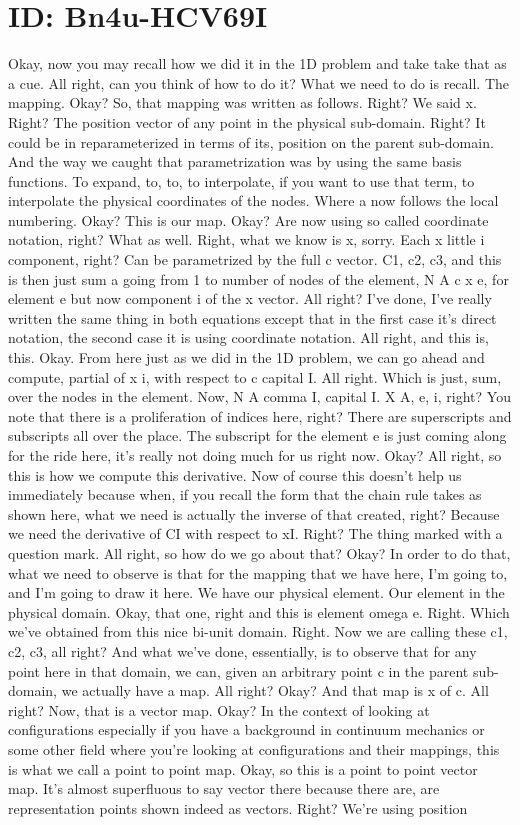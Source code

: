 \documentclass[10pt]{article}
\begin{document}
\section*{ID: Bn4u-HCV69I}
Okay, now you may recall how we did it in the 1D problem and take take that as a cue. All right, can you think of how to do it? What we need to do is recall. The mapping. Okay? So, that mapping was written as follows. Right? We said x. Right? The position vector of any point in the physical sub-domain. Right? It could be in reparameterized in terms of its, position on the parent sub-domain. And the way we caught that parametrization was by using the same basis functions. To expand, to, to, to interpolate, if you want to use that term, to interpolate the physical coordinates of the nodes. Where a now follows the local numbering. Okay? This is our map. Okay? Are now using so called coordinate notation, right? What as well. Right, what we know is x, sorry. Each x little i component, right? Can be parametrized by the full c vector. C1, c2, c3, and this is then just sum a going from 1 to number of nodes of the element, N A c x e, for element e but now component i of the x vector. All right? I've done, I've really written the same thing in both equations except that in the first case it's direct notation, the second case it is using coordinate notation. All right, and this is, this. Okay. From here just as we did in the 1D problem, we can go ahead and compute, partial of x i, with respect to c capital I. All right. Which is just, sum, over the nodes in the element. Now, N A comma I, capital I. X A, e, i, right? You note that there is a proliferation of indices here, right? There are superscripts and subscripts all over the place. The subscript for the element e is just coming along for the ride here, it's really not doing much for us right now. Okay? All right, so this is how we compute this derivative. Now of course this doesn't help us immediately because when, if you recall the form that the chain rule takes as shown here, what we need is actually the inverse of that created, right? Because we need the derivative of CI with respect to xI. Right? The thing marked with a question mark. All right, so how do we go about that? Okay? In order to do that, what we need to observe is that for the mapping that we have here, I'm going to, and I'm going to draw it here. We have our physical element. Our element in the physical domain. Okay, that one, right and this is element omega e. Right. Which we've obtained from this nice bi-unit domain. Right. Now we are calling these c1, c2, c3, all right? And what we've done, essentially, is to observe that for any point here in that domain, we can, given an arbitrary point c in the parent sub-domain, we actually have a map. All right? Okay? And that map is x of c. All right? Now, that is a vector map. Okay? In the context of looking at configurations especially if you have a background in continuum mechanics or some other field where you're looking at configurations and their mappings, this is what we call a point to point map. Okay, so this is a point to point vector map. It's almost superfluous to say vector there because there are, are representation points shown indeed as vectors. Right? We're using position 
\end{document}
